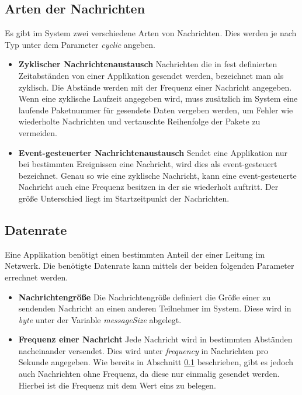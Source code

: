 \subsection{Arten der Nachrichten}\label{sec:ArtNachricht}
Es gibt im System zwei verschiedene Arten von Nachrichten. Dies werden je nach Typ unter dem Parameter \emph{cyclic} angeben. 
\begin{itemize}
	\item \textbf{Zyklischer Nachrichtenaustausch}
	\newline Nachrichten die in fest definierten Zeitabständen von einer Applikation gesendet werden, bezeichnet man als zyklisch. Die Abstände werden mit der Frequenz einer Nachricht angegeben. Wenn eine zyklische Laufzeit angegeben wird, muss zusätzlich im System eine laufende Paketnummer für gesendete Daten vergeben werden, um Fehler wie wiederholte Nachrichten und vertauschte Reihenfolge der Pakete zu vermeiden.
	\item \textbf{Event-gesteuerter Nachrichtenaustausch}
	\newline Sendet eine Applikation nur bei bestimmten Ereignissen eine Nachricht, wird dies als event-gesteuert bezeichnet. Genau so wie eine zyklische Nachricht, kann eine event-gesteuerte Nachricht auch eine Frequenz besitzen in der sie wiederholt auftritt. Der größe Unterschied liegt im Startzeitpunkt der Nachrichten. 
\end{itemize}

\subsection{Datenrate}\label{sec:Datenrate}
Eine Applikation benötigt einen bestimmten Anteil der  einer Leitung im Netzwerk. Die benötigte Datenrate kann mittels der beiden folgenden Parameter errechnet werden.
\begin{itemize}
	\item \textbf{Nachrichtengröße}
	\newline Die Nachrichtengröße definiert die Größe einer zu sendenden Nachricht an einen anderen Teilnehmer im System. Diese wird in \emph{byte} unter der Variable \emph{messageSize} abgelegt.
	\item \textbf{Frequenz einer Nachricht}
	\newline Jede Nachricht wird in bestimmten Abständen nacheinander versendet. Dies wird unter \emph{frequency} in Nachrichten pro Sekunde angegeben. Wie bereits in Abschnitt \ref{sec:ArtNachricht} beschrieben, gibt es jedoch auch Nachrichten ohne Frequenz, da diese nur einmalig gesendet werden. Hierbei ist die Frequenz mit dem Wert eins zu belegen.  
\end{itemize}

